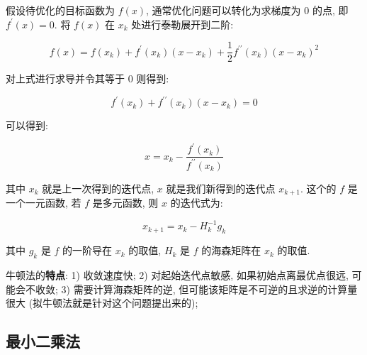 假设待优化的目标函数为 $f(x)$, 通常优化问题可以转化为求梯度为 0 的点, 即 $f^{\prime}(x) = 0$. 将 $f(x)$ 在 $x_k$ 处进行泰勒展开到二阶:

$$
f(x)=f\left(x_{k}\right)+f^{\prime}\left(x_{k}\right)\left(x-x_{k}\right)+\frac{1}{2} f^{\prime \prime}\left(x_{k}\right)\left(x-x_{k}\right)^{2}
$$

对上式进行求导并令其等于 0 则得到:

$$
f^{\prime}\left(x_{k}\right)+f^{\prime \prime}\left(x_{k}\right)\left(x-x_{k}\right)=0
$$

可以得到:

$$
x=x_{k}-\frac{f^{\prime}\left(x_{k}\right)}{f^{\prime \prime}\left(x_{k}\right)}
$$

其中 $x_k$ 就是上一次得到的迭代点, $x$ 就是我们新得到的迭代点 $x_{k+1}$. 这个的 $f$ 是一个一元函数, 若 $f$ 是多元函数, 则 $x$ 的迭代式为:

$$
x_{k+1} = x_k - H^{-1}_k g_k
$$

其中 $g_k$ 是 $f$ 的一阶导在 $x_k$ 的取值, $H_k$ 是 $f$ 的海森矩阵在 $x_k$ 的取值.

牛顿法的\textbf{特点}: 1) 收敛速度快; 2) 对起始迭代点敏感, 如果初始点离最优点很远, 可能会不收敛; 3) 需要计算海森矩阵的逆, 但可能该矩阵是不可逆的且求逆的计算量很大 (拟牛顿法就是针对这个问题提出来的); 

\subsection{最小二乘法}